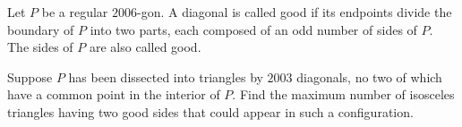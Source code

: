 Let $P$ be a regular $2006$-gon. A diagonal is called good if its endpoints divide the boundary of $P$ into two parts, each composed of an odd number of sides of $P$. The sides of $P$ are also called good.

Suppose $P$ has been dissected into triangles by $2003$ diagonals, no two of which have a common point in the interior of $P$. Find the maximum number of isosceles triangles having two good sides that could appear in such a configuration.